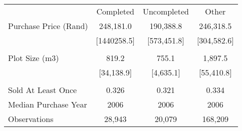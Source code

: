 \begin{tabu}{lccc}
\toprule
 & Completed & Uncompleted & Other  \\
 Purchase Price (Rand)  & 248,181.0  & 190,388.8  & 246,318.5  \\ 
\rowfont{\footnotesize} & [1440258.5]  & [573,451.8]  & [304,582.6]  \\ 
 &  &  &  \\ 
 Plot Size (m3)  & 819.2  & 755.1  & 1,897.5  \\ 
\rowfont{\footnotesize} & [34,138.9]  & [4,635.1]  & [55,410.8]  \\ 
 &  &  &  \\ 
 Sold At Least Once  & 0.326  & 0.321  & 0.334  \\ 
 Median Purchase Year  & 2006  & 2006  & 2006  \\ 
\midrule
 Observations  & 28,943  & 20,079  & 168,209  \\ 
\bottomrule
\end{tabu}
